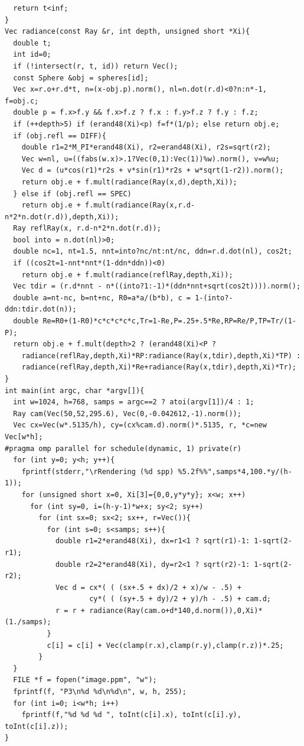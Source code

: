 \begin{verbatim}
  return t<inf; 
} 
Vec radiance(const Ray &r, int depth, unsigned short *Xi){ 
  double t;                               
  int id=0;                               
  if (!intersect(r, t, id)) return Vec(); 
  const Sphere &obj = spheres[id];        
  Vec x=r.o+r.d*t, n=(x-obj.p).norm(), nl=n.dot(r.d)<0?n:n*-1, f=obj.c; 
  double p = f.x>f.y && f.x>f.z ? f.x : f.y>f.z ? f.y : f.z; 
  if (++depth>5) if (erand48(Xi)<p) f=f*(1/p); else return obj.e; 
  if (obj.refl == DIFF){                  
    double r1=2*M_PI*erand48(Xi), r2=erand48(Xi), r2s=sqrt(r2); 
    Vec w=nl, u=((fabs(w.x)>.1?Vec(0,1):Vec(1))%w).norm(), v=w%u; 
    Vec d = (u*cos(r1)*r2s + v*sin(r1)*r2s + w*sqrt(1-r2)).norm(); 
    return obj.e + f.mult(radiance(Ray(x,d),depth,Xi)); 
  } else if (obj.refl == SPEC)            
    return obj.e + f.mult(radiance(Ray(x,r.d-n*2*n.dot(r.d)),depth,Xi)); 
  Ray reflRay(x, r.d-n*2*n.dot(r.d));     
  bool into = n.dot(nl)>0;                
  double nc=1, nt=1.5, nnt=into?nc/nt:nt/nc, ddn=r.d.dot(nl), cos2t; 
  if ((cos2t=1-nnt*nnt*(1-ddn*ddn))<0)    
    return obj.e + f.mult(radiance(reflRay,depth,Xi)); 
  Vec tdir = (r.d*nnt - n*((into?1:-1)*(ddn*nnt+sqrt(cos2t)))).norm(); 
  double a=nt-nc, b=nt+nc, R0=a*a/(b*b), c = 1-(into?-ddn:tdir.dot(n)); 
  double Re=R0+(1-R0)*c*c*c*c*c,Tr=1-Re,P=.25+.5*Re,RP=Re/P,TP=Tr/(1-P); 
  return obj.e + f.mult(depth>2 ? (erand48(Xi)<P ?   
    radiance(reflRay,depth,Xi)*RP:radiance(Ray(x,tdir),depth,Xi)*TP) : 
    radiance(reflRay,depth,Xi)*Re+radiance(Ray(x,tdir),depth,Xi)*Tr); 
} 
int main(int argc, char *argv[]){ 
  int w=1024, h=768, samps = argc==2 ? atoi(argv[1])/4 : 1; 
  Ray cam(Vec(50,52,295.6), Vec(0,-0.042612,-1).norm()); 
  Vec cx=Vec(w*.5135/h), cy=(cx%cam.d).norm()*.5135, r, *c=new Vec[w*h]; 
#pragma omp parallel for schedule(dynamic, 1) private(r)       
  for (int y=0; y<h; y++){                       
    fprintf(stderr,"\rRendering (%d spp) %5.2f%%",samps*4,100.*y/(h-1)); 
    for (unsigned short x=0, Xi[3]={0,0,y*y*y}; x<w; x++)   
      for (int sy=0, i=(h-y-1)*w+x; sy<2; sy++)     
        for (int sx=0; sx<2; sx++, r=Vec()){        
          for (int s=0; s<samps; s++){ 
            double r1=2*erand48(Xi), dx=r1<1 ? sqrt(r1)-1: 1-sqrt(2-r1); 
            double r2=2*erand48(Xi), dy=r2<1 ? sqrt(r2)-1: 1-sqrt(2-r2); 
            Vec d = cx*( ( (sx+.5 + dx)/2 + x)/w - .5) + 
                    cy*( ( (sy+.5 + dy)/2 + y)/h - .5) + cam.d; 
            r = r + radiance(Ray(cam.o+d*140,d.norm()),0,Xi)*(1./samps); 
          } 
          c[i] = c[i] + Vec(clamp(r.x),clamp(r.y),clamp(r.z))*.25; 
        } 
  } 
  FILE *f = fopen("image.ppm", "w");         
  fprintf(f, "P3\n%d %d\n%d\n", w, h, 255); 
  for (int i=0; i<w*h; i++) 
    fprintf(f,"%d %d %d ", toInt(c[i].x), toInt(c[i].y), toInt(c[i].z)); 
} 
\end{verbatim}
